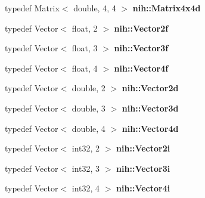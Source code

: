 \begin{DoxyCompactItemize}
\item 
\hypertarget{group__linalg_gae98749c4d28911f80b68e56efb46b7c8}{
typedef \-Matrix$<$ double, 4, 4 $>$ {\bfseries nih\-::\-Matrix4x4d}}
\label{group__linalg_gae98749c4d28911f80b68e56efb46b7c8}

\item 
\hypertarget{group__linalg_gabbcc1381565199b14a44e3afc944ca17}{
typedef \-Vector$<$ float, 2 $>$ {\bfseries nih\-::\-Vector2f}}
\label{group__linalg_gabbcc1381565199b14a44e3afc944ca17}

\item 
\hypertarget{group__linalg_ga0647b3ed4341a247c1e76e5b53093b5f}{
typedef \-Vector$<$ float, 3 $>$ {\bfseries nih\-::\-Vector3f}}
\label{group__linalg_ga0647b3ed4341a247c1e76e5b53093b5f}

\item 
\hypertarget{group__linalg_ga7995ea0516a644636ad92f4b7bc04eaa}{
typedef \-Vector$<$ float, 4 $>$ {\bfseries nih\-::\-Vector4f}}
\label{group__linalg_ga7995ea0516a644636ad92f4b7bc04eaa}

\item 
\hypertarget{group__linalg_ga4fc7e6a2c6996a3e747fbedbb67e1863}{
typedef \-Vector$<$ double, 2 $>$ {\bfseries nih\-::\-Vector2d}}
\label{group__linalg_ga4fc7e6a2c6996a3e747fbedbb67e1863}

\item 
\hypertarget{group__linalg_ga7c1aad15ff15343ac537134d394ef70c}{
typedef \-Vector$<$ double, 3 $>$ {\bfseries nih\-::\-Vector3d}}
\label{group__linalg_ga7c1aad15ff15343ac537134d394ef70c}

\item 
\hypertarget{group__linalg_gaf88cc8ac3ee4154632f9ab07406e2921}{
typedef \-Vector$<$ double, 4 $>$ {\bfseries nih\-::\-Vector4d}}
\label{group__linalg_gaf88cc8ac3ee4154632f9ab07406e2921}

\item 
\hypertarget{group__linalg_ga5ce7ab86d5f4892fa9c675180f5859d7}{
typedef \-Vector$<$ int32, 2 $>$ {\bfseries nih\-::\-Vector2i}}
\label{group__linalg_ga5ce7ab86d5f4892fa9c675180f5859d7}

\item 
\hypertarget{group__linalg_gad0b51f8145e2a7f3065115fecdfd8609}{
typedef \-Vector$<$ int32, 3 $>$ {\bfseries nih\-::\-Vector3i}}
\label{group__linalg_gad0b51f8145e2a7f3065115fecdfd8609}

\item 
\hypertarget{group__linalg_ga2d7d8141688508f19e965e06e48636de}{
typedef \-Vector$<$ int32, 4 $>$ {\bfseries nih\-::\-Vector4i}}
\label{group__linalg_ga2d7d8141688508f19e965e06e48636de}

\end{DoxyCompactItemize}
